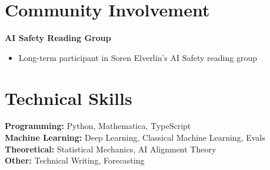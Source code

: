 \documentclass{article}
\begin{document}
\section*{Community Involvement}
\textbf{AI Safety Reading Group}
\begin{itemize}[leftmargin=*]
\item Long-term participant in Soren Elverlin's AI Safety reading group
\end{itemize}

\section*{Technical Skills}
\textbf{Programming:} Python, Mathematica, TypeScript\\
\textbf{Machine Learning:} Deep Learning, Classical Machine Learning, Evals\\
\textbf{Theoretical:} Statistical Mechanics, AI Alignment Theory\\
\textbf{Other:} Technical Writing, Forecasting
\end{document}

